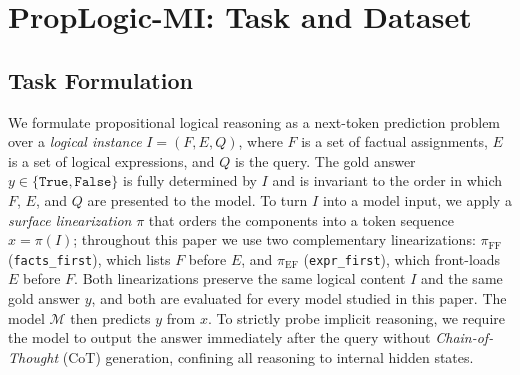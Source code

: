\documentclass[11pt]{article}
\begin{document}

\section{PropLogic-MI: Task and Dataset}
\label{sec:proplogic_mi}


\subsection{Task Formulation}
\label{sec:task}

We formulate propositional logical reasoning as a next-token prediction problem over a \emph{logical instance} $I = (F, E, Q)$, where $F$ is a set of factual assignments, $E$ is a set of logical expressions, and $Q$ is the query. The gold answer $y \in \{\texttt{True}, \texttt{False}\}$ is fully determined by $I$ and is invariant to the order in which $F$, $E$, and $Q$ are presented to the model. To turn $I$ into a model input, we apply a \emph{surface linearization} $\pi$ that orders the components into a token sequence $x = \pi(I)$; throughout this paper we use two complementary linearizations: $\pi_{\mathrm{FF}}$ (\texttt{facts\_first}), which lists $F$ before $E$, and $\pi_{\mathrm{EF}}$ (\texttt{expr\_first}), which front-loads $E$ before $F$. Both linearizations preserve the same logical content $I$ and the same gold answer $y$, and both are evaluated for every model studied in this paper. The model $\mathcal{M}$ then predicts $y$ from $x$. To strictly probe implicit reasoning, we require the model to output the answer immediately after the query without \textit{Chain-of-Thought} (CoT) generation, confining all reasoning to internal hidden states.
\end{document}
